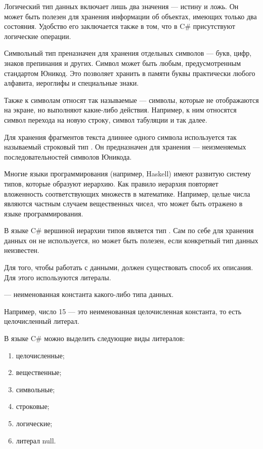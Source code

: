 
Логический тип данных  включает лишь два значения — истину и
ложь. Он может быть полезен для хранения информации об объектах,
имеющих только два состояния. Удобство его заключается также в том,
что в C\# присутствуют логические операции.


Символьный тип  преназначен для хранения отдельных символов —
букв, цифр, знаков препинания и других. Символ может быть любым,
предусмотренным стандартом Юникод. Это позволяет хранить в памяти
буквы практически любого алфавита, иероглифы и специальные знаки.

Также к символам относят так называемые  — символы,
которые не отображаются на экране, но выполняют какие-либо
действия. Например, к ним относятся символ перехода на новую строку,
символ табуляции и так далее.


Для хранения фрагментов текста длиннее одного символа используется так
называемый строковый тип . Он предназначен для хранения
 — неизменяемых последовательностей символов
Юникода.


Многие языки программирования (например, Haskell) имеют развитую
систему типов, которые образуют иерархию. Как правило иерархия
повторяет вложенность соответствующих множеств в математике. Например,
целые числа являются частным случаем вещественных чисел, что может
быть отражено в языке программирования.

В языке C\# вершиной иерархии типов является тип .  Сам
по себе для хранения данных он не используется, но может быть полезен,
если конкретный тип данных неизвестен.


Для того, чтобы работать с данными, должен существовать способ их
описания. Для этого используются литералы.

\begin{defn}
   — неименованная константа какого-либо типа
  данных.
\end{defn}

Например, число 15 — это неименованная целочисленная константа, то
есть целочисленный литерал.

В языке C\# можно выделить следующие виды литералов:
\begin{enumerate}
\item целочисленные;
\item вещественные;
\item символьные;
\item строковые;
\item логические;
\item литерал null.
\end{enumerate}

